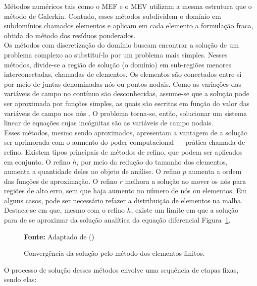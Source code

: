 \indent Métodos numéricos tais como o MEF e o MEV utilizam a mesma estrutura que o método de Galerkin. Contudo, esses métodos subdividem o domínio em subdomínios chamados elementos e aplicam em cada elemento a formulação fraca, obtida do método dos resíduos ponderados.\\
\indent Os métodos com discretização do domínio buscam encontrar a solução de um problema complexo ao substituí-lo por um problema mais simples. Nesses métodos, divide-se a região de solução (o domínio) em sub-regiões menores interconectadas, chamadas de elementos. Os elementos são conectados entre si por meio de juntas denominadas nós ou pontos nodais. Como as variações das variáveis de campo no contínuo são desconhecidas, assume-se que a solução pode ser aproximada por funções simples, as quais são escritas em função do valor das variáveis de campo nos nós \citet{rao2017finite}. O problema torna-se, então, solucionar um sistema linear de equações cujas incógnitas são as variáveis de campo nodais.\\
\indent Esses métodos, mesmo sendo aproximados, apresentam a vantagem de a solução ser aprimorada com o aumento do poder computacional — prática chamada de refino. Existem tipos principais de métodos de refino, que podem ser aplicados em conjunto. O refino $h$, por meio da redução do tamanho dos elementos, aumenta a quantidade deles no objeto de análise. O refino $p$ aumenta a ordem das funções de aproximação. O refino $r$ melhora a solução ao mover os nós para regiões de alto erro, sem que haja aumento no número de nós ou elementos. Em alguns casos, pode ser necessário refazer a distribuição de elementos na malha. Destaca-se em \citet{rao2017finite} que, mesmo com o refino $h$, existe um limite em que a solução para de se aproximar da solução analítica da equação diferencial Figura~\ref{fig:3.10}.

\begin{figure}[H]
    \centering
    \caption{Convergência da solução pelo método dos elementos finitos.}
    \resizebox{\textwidth}{!}{}
    \label{fig:3.10}    
    
    {\small \textbf{Fonte:} Adaptado de (\citet{rao2017finite})}
\end{figure}

\indent O processo de solução desses métodos envolve uma sequência de etapas fixas, sendo elas:

